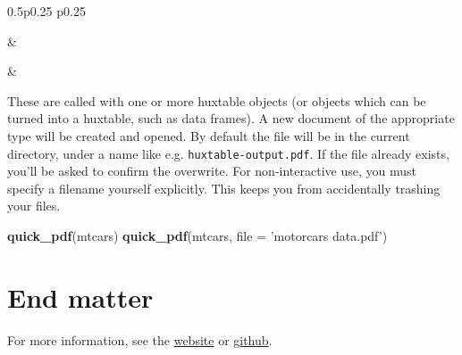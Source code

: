 \documentclass[]{article}
\newenvironment{Shaded}{\begin{snugshade}}{\end{snugshade}}
\newcommand{\DataTypeTok}[1]{\textcolor[rgb]{0.13,0.29,0.53}{#1}}
\newcommand{\KeywordTok}[1]{\textcolor[rgb]{0.13,0.29,0.53}{\textbf{#1}}}
\newcommand{\NormalTok}[1]{#1}
\newcommand{\StringTok}[1]{\textcolor[rgb]{0.31,0.60,0.02}{#1}}
\begin{document}
\begin{table}[h]
\begin{raggedright}
\begin{tabularx}{0.5\textwidth}{p{} p{}}

 &
 \tabularnewline[-0.5pt]



 &
 \tabularnewline[-0.5pt]


\end{tabularx}\par\end{raggedright}
\end{table}
 

\FloatBarrier

These are called with one or more huxtable objects (or objects which can
be turned into a huxtable, such as data frames). A new document of the
appropriate type will be created and opened. By default the file will be
in the current directory, under a name like e.g.
\texttt{huxtable-output.pdf}. If the file already exists, you'll be
asked to confirm the overwrite. For non-interactive use, you must
specify a filename yourself explicitly. This keeps you from accidentally
trashing your files.

\begin{Shaded}
\begin{Highlighting}[]
\KeywordTok{quick_pdf}\NormalTok{(mtcars) }
\KeywordTok{quick_pdf}\NormalTok{(mtcars, }\DataTypeTok{file =} \StringTok{'motorcars data.pdf'}\NormalTok{)}
\end{Highlighting}
\end{Shaded}

\FloatBarrier

\hypertarget{end-matter}{%
\section{End matter}\label{end-matter}}

For more information, see the
\href{https://hughjonesd.github.io/huxtable}{website} or
\href{https://github.com/hughjonesd/huxtable}{github}.
\end{document}
